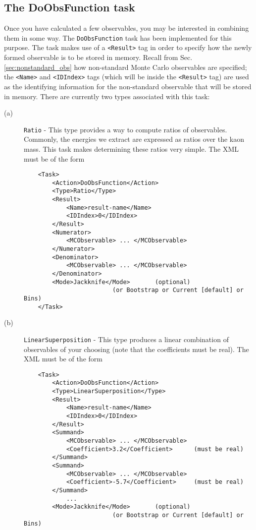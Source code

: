 \documentclass[12pt]{article}
\newcommand{\vb}{\texttt}
\begin{document}
\subsection{The DoObsFunction task}

Once you have calculated a few observables, you may be interested in combining them in some way.
The \vb{DoObsFunction} task has been implemented for this purpose.
The task makes use of a \vb{<Result>} tag in order to specify how
the newly formed observable is to be stored in memory.
Recall from Sec. \ref{sec:nonstandard_obs}
how non-standard Monte Carlo observables are specified; the \vb{<Name>}
and \vb{<IDIndex>} tags (which will be inside the \vb{<Result>} tag)
are used as the identifying information
for the non-standard observable that will be stored in memory.
There are currently two types
associated with this task:
\begin{description}
\item[(a)] \vb{Ratio} - This type provides a way to compute ratios of observables. Commonly,
the energies we extract are expressed as ratios over the kaon mass. This task makes
determining these ratios very simple. The XML must be of the form
\begin{verbatim}
    <Task>
        <Action>DoObsFunction</Action>
        <Type>Ratio</Type>
        <Result>
            <Name>result-name</Name>
            <IDIndex>0</IDIndex>
        </Result>
        <Numerator>
            <MCObservable> ... </MCObservable>
        </Numerator>
        <Denominator>
            <MCObservable> ... </MCObservable>
        </Denominator>
        <Mode>Jackknife</Mode>       (optional)
                         (or Bootstrap or Current [default] or Bins)
    </Task>
\end{verbatim}
\item[(b)] \vb{LinearSuperposition} - This type produces a linear combination
of observables of your choosing (note that the coefficients must be real).
The XML must be of the form
\begin{verbatim}
    <Task>
        <Action>DoObsFunction</Action>
        <Type>LinearSuperposition</Type>
        <Result>
            <Name>result-name</Name>
            <IDIndex>0</IDIndex>
        </Result>
        <Summand>
            <MCObservable> ... </MCObservable>
            <Coefficient>3.2</Coefficient>      (must be real)
        </Summand>
        <Summand>
            <MCObservable> ... </MCObservable>
            <Coefficient>-5.7</Coefficient>     (must be real)
        </Summand>
            ...
        <Mode>Jackknife</Mode>       (optional)
                         (or Bootstrap or Current [default] or Bins)
\end{verbatim}
\end{description}
\end{document}
